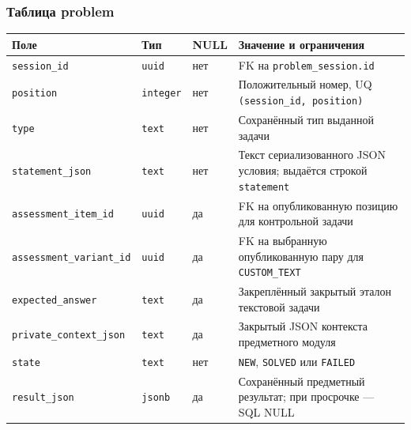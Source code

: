 \documentclass[12pt,a4paper]{article}
\newcounter{none} %
\begin{document}
\subsubsection{Таблица problem}\label{ux442ux430ux431ux43bux438ux446ux430-problem}

\hypertarget{таблица-problem}{}

{\def\LTcaptype{none} %
\begin{longtable}[]{@{}
  >{\raggedright\arraybackslash}p{}
  >{\raggedright\arraybackslash}p{}
  >{\raggedright\arraybackslash}p{}
  >{\raggedright\arraybackslash}p{}@{}}
\toprule\noalign{}
\begin{minipage}[b]{\linewidth}\raggedright
Поле
\end{minipage} & \begin{minipage}[b]{\linewidth}\raggedright
Тип
\end{minipage} & \begin{minipage}[b]{\linewidth}\raggedright
NULL
\end{minipage} & \begin{minipage}[b]{\linewidth}\raggedright
Значение и ограничения
\end{minipage} \\
\midrule\noalign{}
\endhead
\bottomrule\noalign{}
\endlastfoot
\texttt{session\_id} & \texttt{uuid} & нет & FK на \texttt{problem\_\allowbreak{}session.\allowbreak{}id} \\
\texttt{position} & \texttt{integer} & нет & Положительный номер, UQ \texttt{(session\_\allowbreak{}id, position)} \\
\texttt{type} & \texttt{text} & нет & Сохранённый тип выданной задачи \\
\texttt{statement\_\allowbreak{}json} & \texttt{text} & нет & Текст сериализованного JSON условия; выдаётся строкой \texttt{statement} \\
\texttt{assessment\_\allowbreak{}item\_\allowbreak{}id} & \texttt{uuid} & да & FK на опубликованную позицию для контрольной задачи \\
\texttt{assessment\_\allowbreak{}variant\_\allowbreak{}id} & \texttt{uuid} & да & FK на выбранную опубликованную пару для \texttt{CUSTOM\_\allowbreak{}TEXT} \\
\texttt{expected\_\allowbreak{}answer} & \texttt{text} & да & Закреплённый закрытый эталон текстовой задачи \\
\texttt{private\_\allowbreak{}context\_\allowbreak{}json} & \texttt{text} & да & Закрытый JSON контекста предметного модуля \\
\texttt{state} & \texttt{text} & нет & \texttt{NEW}, \texttt{SOLVED} или \texttt{FAILED} \\
\texttt{result\_\allowbreak{}json} & \texttt{jsonb} & да & Сохранённый предметный результат; при просрочке --- SQL NULL \\
\end{longtable}
}
\end{document}

